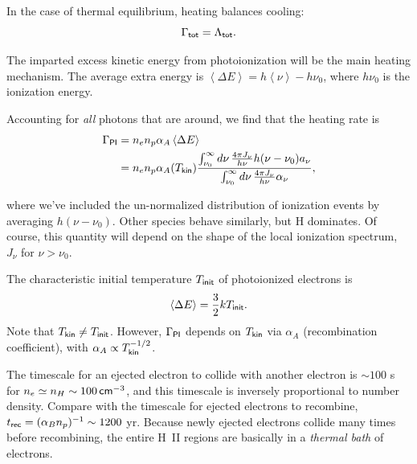 \documentclass{tufte-handout}
\renewcommand{\rm}{\sf}
\newcommand{\HII}{\textnormal{H{\smaller~\textsc{II}}}}
\newcommand{\ev}[1]{\left\langle  {#1} \right \rangle} %
\begin{document}
In the case of thermal equilibrium, heating balances cooling:
\[\Gamma_{\rm tot} = \Lambda_{\rm tot}.\]

The imparted excess kinetic energy from photoionization will be the main heating mechanism. The average extra energy is $\ev{\Delta E} = h\ev{\nu} - h \nu_0$, where $h\nu_0$ is the ionization energy.

Accounting for \textit{all} photons that are around, we find that the heating rate is
\begin{align}
\Gamma_{\rm PI} &= n_e n_p \alpha_A \ev{\Delta E} \nonumber \\
&= n_e n_p \alpha_A(T_{\rm kin}) \frac{\int_{\nu_0}^\infty d\nu \, \frac{4\pi J_\nu}{h\nu} h(\nu-\nu_0) a_\nu }{\int_{\nu_0}^\infty d\nu\, \frac{4\pi J_\nu}{h\nu} \alpha_\nu},
\end{align}

where we've included the un-normalized distribution of ionization events by averaging $h(\nu-\nu_0)$. Other species behave similarly, but H dominates. Of course, this quantity will depend on the shape of the local ionization spectrum, $J_\nu$ for $\nu > \nu_0$.

The characteristic initial temperature $T_{\rm init}$ of photoionized electrons is 
\[\ev{\Delta E} = \frac{3}{2} k T_{\rm init}.\]
Note that $T_{\rm kin} \neq T_{\rm init}$. However, $\Gamma_{\rm PI}$ depends on $T_{\rm kin}$ via $\alpha_A$ (recombination coefficient), with $\alpha_A \propto T_{\rm kin}^{-1/2}$.

The timescale for an ejected electron to collide with another electron is $\sim 100$ s for $n_e \simeq n_H \sim 100 \, {\rm cm}^{-3}$, and this timescale is inversely proportional to number density. Compare with the timescale for ejected electrons to recombine, $t_{\rm rec} = (\alpha_B n_p)^{-1} \sim 1200$ yr. Because newly ejected electrons collide many times before recombining, the entire \HII{} regions are basically in a \textit{thermal bath} of electrons.
\end{document}
